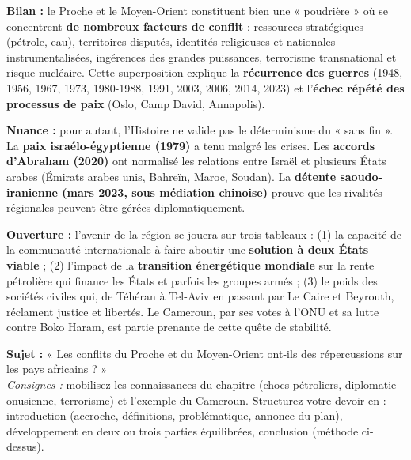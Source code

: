 \documentclass[11pt]{article}
\begin{document}
\begin{aretenir}
\textbf{Bilan :} le Proche et le Moyen-Orient constituent bien une « poudrière » où se concentrent \textbf{de nombreux facteurs de conflit} : ressources stratégiques (pétrole, eau), territoires disputés, identités religieuses et nationales instrumentalisées, ingérences des grandes puissances, terrorisme transnational et risque nucléaire. Cette superposition explique la \textbf{récurrence des guerres} (1948, 1956, 1967, 1973, 1980-1988, 1991, 2003, 2006, 2014, 2023) et l'\textbf{échec répété des processus de paix} (Oslo, Camp David, Annapolis).

\textbf{Nuance :} pour autant, l'Histoire ne valide pas le déterminisme du « sans fin ». La \textbf{paix israélo-égyptienne (1979)} a tenu malgré les crises. Les \textbf{accords d'Abraham (2020)} ont normalisé les relations entre Israël et plusieurs États arabes (Émirats arabes unis, Bahreïn, Maroc, Soudan). La \textbf{détente saoudo-iranienne (mars 2023, sous médiation chinoise)} prouve que les rivalités régionales peuvent être gérées diplomatiquement.

\textbf{Ouverture :} l'avenir de la région se jouera sur trois tableaux : (1) la capacité de la communauté internationale à faire aboutir une \textbf{solution à deux États viable} ; (2) l'impact de la \textbf{transition énergétique mondiale} sur la rente pétrolière qui finance les États et parfois les groupes armés ; (3) le poids des sociétés civiles qui, de Téhéran à Tel-Aviv en passant par Le Caire et Beyrouth, réclament justice et libertés. Le Cameroun, par ses votes à l'ONU et sa lutte contre Boko Haram, est partie prenante de cette quête de stabilité.
\end{aretenir}

\begin{exercice}
\textbf{Sujet :} « Les conflits du Proche et du Moyen-Orient ont-ils des répercussions sur les pays africains ? » \\
\emph{Consignes :} mobilisez les connaissances du chapitre (chocs pétroliers, diplomatie onusienne, terrorisme) et l'exemple du Cameroun. Structurez votre devoir en : introduction (accroche, définitions, problématique, annonce du plan), développement en deux ou trois parties équilibrées, conclusion (méthode ci-dessus).
\end{exercice}
\end{document}
